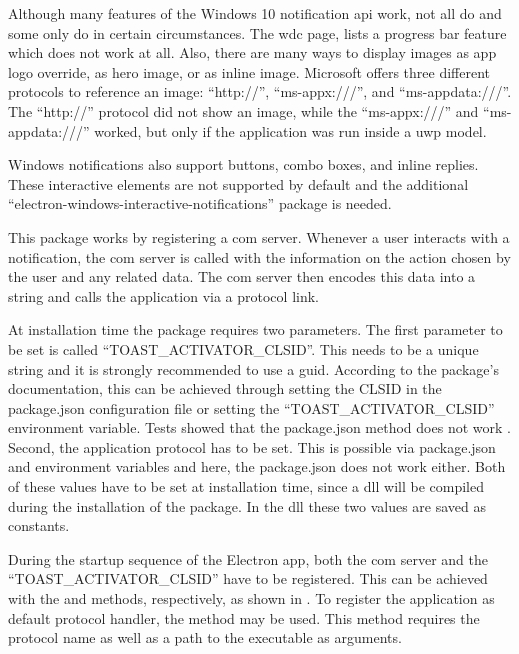 Although many features of the Windows 10 notification \gls{api} work, not all do and some only do in certain circumstances. The \gls{wdc} page, \zB lists a progress bar feature which does not work at all. Also, there are many ways to display images \zB as app logo override, as hero image, or as inline image. Microsoft offers three different protocols to reference an image: \enquote{http://}, \enquote{ms-appx:///}, and \enquote{ms-appdata:///}. The \enquote{http://} protocol did not show an image, while the \enquote{ms-appx:///} and \enquote{ms-appdata:///} worked, but only if the application was run inside a \gls{uwp} model. \cite{toastContent}


Windows notifications also support buttons, combo boxes, and inline replies. These interactive elements are not supported by default and the additional \enquote{electron-windows-interactive-notifications} package is needed.

This package works by registering a \gls{com} server. Whenever a user interacts with a notification, the \gls{com} server is called with the information on the action chosen by the user and any related data. The \gls{com} server then encodes this data into a string and calls the application via a protocol link.

At installation time the package requires two parameters. The first parameter to be set is called \enquote{TOAST\_ACTIVATOR\_CLSID}. This needs to be a unique string and it is strongly recommended to use a \gls{guid}. According to the package's documentation, this can be achieved through setting the CLSID in the package.json configuration file or setting the \enquote{TOAST\_ACTIVATOR\_CLSID} environment variable. Tests showed that the package.json method does not work \cite{clsidPackageJson}. Second, the application protocol has to be set. This is possible via package.json and environment variables and here, the package.json does not work either. Both of these values have to be set at installation time, since a \gls{dll} will be compiled during the installation of the package. In the \gls{dll} these two values are saved as constants.

During the startup sequence of the Electron app, both the \gls{com} server and the \enquote{TOAST\_ACTIVATOR\_CLSID} have to be registered. This can be achieved with the  and  methods, respectively, as shown in . To register the application as default protocol handler, the  method may be used. This method requires the protocol name as well as a path to the executable as arguments.


